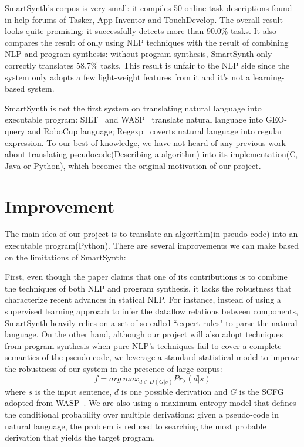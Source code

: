 \documentclass[10pt]{article}
\begin{document}
SmartSynth's corpus is very small: it compiles 50 online task descriptions found in
help forums of Tasker, App Inventor and TouchDevelop. The overall result
looks quite promising: it successfully detects more than 90.0\% tasks. It also compares 
the result of only using NLP techniques with the result of combining NLP and program 
synthesis: without program synthesis, SmartSynth only correctly translates 58.7\% tasks. 
This result is unfair to the NLP side since the system only adopts a few light-weight 
features from it and it's not a learning-based system.

SmartSynth is not the first system on translating natural language into executable
program: SILT~\cite{silt} and WASP~\citep{wasp} translate natural language into GEO-query 
and RoboCup language; Regexp~\cite{reg} coverts natural language into regular expression.
To our best of knowledge, we have not heard of any previous work about translating
 pseudocode(Describing a algorithm) into its implementation(C, Java or Python), 
which becomes the original motivation of our project.
\section{Improvement}\label{sec:alg}
The main idea of our project is to translate an algorithm(in pseudo-code) into an 
executable program(Python). There are several improvements we can make based on the 
limitations of SmartSynth:

First, even though the paper claims that one of its contributions is to combine the
techniques of both NLP and program synthesis, it lacks the robustness that characterize
recent advances in statical NLP. For instance, instead of using a supervised learning 
approach to infer the dataflow relations between components, SmartSynth heavily 
relies on a set of so-called ``expert-rules" to parse the natural language. On the 
other hand, although our project will also adopt techniques from program synthesis when 
pure NLP's techniques fail to cover a complete semantics of the pseudo-code, we 
leverage a standard statistical model to improve the 
robustness of our system in the presence of large corpus: 
\[
f = arg \ max_{d\in D(G|s)} Pr_{\lambda}(d|s)
\]
where $s$ is the input sentence, $d$ is one possible derivation and $G$ is the 
SCFG adopted from WASP~\cite{wasp}.
We are also using a maximum-entropy model that defines the conditional probability 
over multiple derivations: given a pseudo-code in natural language, the problem is reduced to searching the most probable derivation that yields the target program.
\end{document}
